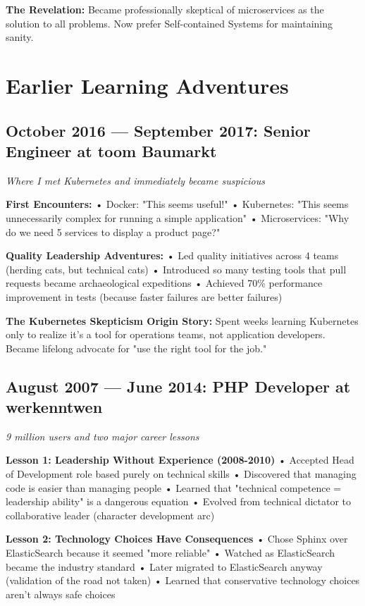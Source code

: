 \documentclass[10pt,a4paper]{article}
\begin{document}
\textbf{The Revelation:} Became professionally skeptical of microservices as the solution to all problems. Now prefer Self-contained Systems for maintaining sanity.

\section{Earlier Learning Adventures}

\subsection{October 2016 — September 2017: Senior Engineer at toom Baumarkt}
\textit{Where I met Kubernetes and immediately became suspicious}

\textbf{First Encounters:}
• Docker: "This seems useful!"
• Kubernetes: "This seems unnecessarily complex for running a simple application"
• Microservices: "Why do we need 5 services to display a product page?"

\textbf{Quality Leadership Adventures:}
• Led quality initiatives across 4 teams (herding cats, but technical cats)
• Introduced so many testing tools that pull requests became archaeological expeditions
• Achieved 70\% performance improvement in tests (because faster failures are better failures)

\textbf{The Kubernetes Skepticism Origin Story:} Spent weeks learning Kubernetes only to realize it's a tool for operations teams, not application developers. Became lifelong advocate for "use the right tool for the job."

\subsection{August 2007 — June 2014: PHP Developer at werkenntwen}
\textit{9 million users and two major career lessons}

\textbf{Lesson 1: Leadership Without Experience (2008-2010)}
• Accepted Head of Development role based purely on technical skills
• Discovered that managing code is easier than managing people
• Learned that "technical competence = leadership ability" is a dangerous equation
• Evolved from technical dictator to collaborative leader (character development arc)

\textbf{Lesson 2: Technology Choices Have Consequences}
• Chose Sphinx over ElasticSearch because it seemed "more reliable"
• Watched as ElasticSearch became the industry standard
• Later migrated to ElasticSearch anyway (validation of the road not taken)
• Learned that conservative technology choices aren't always safe choices
\end{document}
